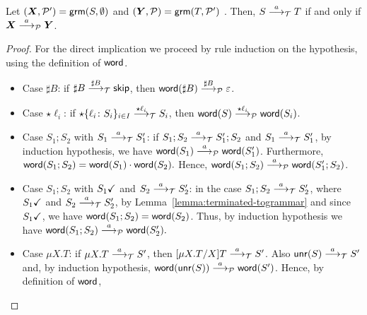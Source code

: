 \newcommand{\grmcontext}{
  $(\vec X, \productions') = \grm(S, \emptyset)$ and 
  $(\vec Y, \productions) = \grm(T, \productions')$%
}

\begin{lemma}
  \label{lem:transitions_mimic}
  Let \grmcontext. Then, 
  $S \LTSderives T$ if and only if $\vec X \LTSderivesP \vec Y$.
\end{lemma}
%
\begin{proof}
	For the direct implication we proceed by rule induction on the
	hypothesis, using the definition of $\word$.
	
	\begin{itemize}
		\item Case $\sharp B$: if $\sharp B \LTSderives[\sharp B] \skipk$, then 
			$\word(\sharp B) \LTSderivesP[\sharp B] \varepsilon$.
		\item Case $\star \ell_i$: if
		$\star\{\ell_i\colon S_i\}_{i\in I} \LTSderives[\star \ell_i] S_i$, then
		$\word(S) \LTSderivesP[\star \ell_i] \word(S_i)$.
		\item Case $S_1;S_2$ with $S_1\LTSderives S_1'$:
		if $S_1;S_2\LTSderives S_1';S_2$ and $S_1\LTSderives S_1'$,
			by induction hypothesis, we have $\word(S_1) \LTSderivesP \word(S_1')$.
			Furthermore, 
				$\word(S_1;S_2) = \word(S_1)\cdot\word(S_2).	$
			Hence, $\word(S_1;S_2) \LTSderivesP \word(S_1';S_2)$.
		\item Case $S_1;S_2$ with $\DONE{S_1}$ and $S_2\LTSderives S_2'$: 
			in the case $S_1;S_2\LTSderives S_2'$, where
			$\DONE{S_1}$ and $S_2\LTSderives S_2'$, 
			by %
			Lemma~\ref{lemma:terminated-togrammar} and since $\DONE{S_1}$, 
			we have $\word(S_1;S_2) = \word(S_2)$.
			Thus, by induction hypothesis we have 
			$\word(S_1;S_2) \LTSderivesP \word(S_2').$
		\item Case $\mu X.T$: if $\mu X.T\LTSderives S'$, 
			then $\subs {\mu X. T}{X}{T} \LTSderives S'$. Also
			$\Unravel(S) \LTSderives S'$ and, by induction hypothesis,
			$\word(\Unravel(S))\LTSderivesP \word(S')$. Hence, by 
			definition of $\word$, 

\end{itemize}
\end{proof}

